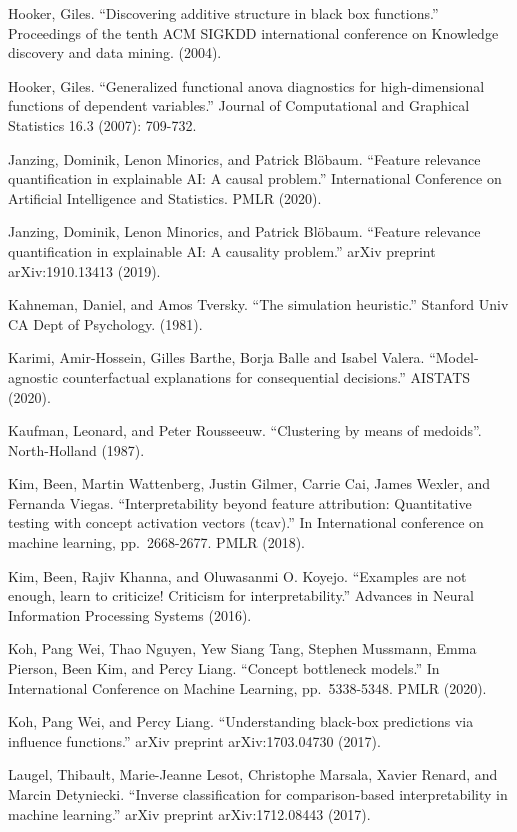 \documentclass[
  11pt,
]{scrbook}
\begin{document}
Hooker, Giles. ``Discovering additive structure in black box functions.'' Proceedings of the tenth ACM SIGKDD international conference on Knowledge discovery and data mining. (2004).

Hooker, Giles. ``Generalized functional anova diagnostics for high-dimensional functions of dependent variables.'' Journal of Computational and Graphical Statistics 16.3 (2007): 709-732.

Janzing, Dominik, Lenon Minorics, and Patrick Blöbaum. ``Feature relevance quantification in explainable AI: A causal problem.'' International Conference on Artificial Intelligence and Statistics. PMLR (2020).

Janzing, Dominik, Lenon Minorics, and Patrick Blöbaum. ``Feature relevance quantification in explainable AI: A causality problem.'' arXiv preprint arXiv:1910.13413 (2019).

Kahneman, Daniel, and Amos Tversky. ``The simulation heuristic.'' Stanford Univ CA Dept of Psychology. (1981).

Karimi, Amir-Hossein, Gilles Barthe, Borja Balle and Isabel Valera. ``Model-agnostic counterfactual explanations for consequential decisions.'' AISTATS (2020).

Kaufman, Leonard, and Peter Rousseeuw. ``Clustering by means of medoids''. North-Holland (1987).

Kim, Been, Martin Wattenberg, Justin Gilmer, Carrie Cai, James Wexler, and Fernanda Viegas. ``Interpretability beyond feature attribution: Quantitative testing with concept activation vectors (tcav).'' In International conference on machine learning, pp.~2668-2677. PMLR (2018).

Kim, Been, Rajiv Khanna, and Oluwasanmi O. Koyejo. ``Examples are not enough, learn to criticize! Criticism for interpretability.'' Advances in Neural Information Processing Systems (2016).

Koh, Pang Wei, Thao Nguyen, Yew Siang Tang, Stephen Mussmann, Emma Pierson, Been Kim, and Percy Liang. ``Concept bottleneck models.'' In International Conference on Machine Learning, pp.~5338-5348. PMLR (2020).

Koh, Pang Wei, and Percy Liang. ``Understanding black-box predictions via influence functions.'' arXiv preprint arXiv:1703.04730 (2017).

Laugel, Thibault, Marie-Jeanne Lesot, Christophe Marsala, Xavier Renard, and Marcin Detyniecki. ``Inverse classification for comparison-based interpretability in machine learning.'' arXiv preprint arXiv:1712.08443 (2017).
\end{document}
